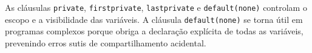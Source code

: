 \documentclass[11pt,letterpaper]{article}
\begin{document}
As cláusulas \texttt{private}, \texttt{firstprivate}, \texttt{lastprivate} e \texttt{default(none)} controlam o escopo e a visibilidade das variáveis. A cláusula \texttt{default(none)} se torna útil em programas complexos porque obriga a declaração explícita de todas as variáveis, prevenindo erros sutis de compartilhamento acidental.
\end{document}
